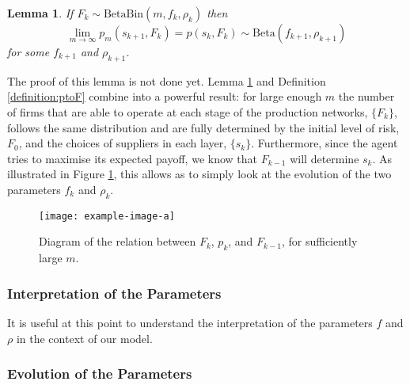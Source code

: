 \documentclass[american, abstract=on]{scrartcl}
\newcommand{\inputTikZ}[2]{%
        \scalebox{#1}{}  
      }
\theoremstyle{plain}
\newtheorem{lemma}{Lemma}
\newcommand{\Beta}{\text{Beta}}
\newcommand{\Bin}{\text{Bin}}
\begin{document}
\begin{lemma} \label{lemma:Ftop}
  If $F_k \sim \Beta\Bin(m, f_k, \rho_k)$ then \begin{equation*}\lim_{m \rightarrow \infty} p_m(s_{k + 1}, F_k) = p(s_k, F_k) \sim \Beta(f_{k + 1}, \rho_{k + 1})\end{equation*} for some $f_{k + 1}$ and $\rho_{k + 1}$.
\end{lemma}

The proof of this lemma {\color{red} is not done yet.} Lemma \ref*{lemma:Ftop} and Definition \ref*{definition:ptoF} combine into a powerful result: for large enough $m$ the number of firms that are able to operate at each stage of the production networks, $\{F_k\}$, follows the same distribution and are fully determined by the initial level of risk, $F_0$, and the choices of suppliers in each layer, $\{s_k\}$. Furthermore, since the agent tries to maximise its expected payoff, we know that $F_{k - 1}$ will determine $s_k$. As illustrated in Figure \ref*{fig:propagation-of-risk}, this allows as to simply look at the evolution of the two parameters $f_k$ and $\rho_k$.


\begin{figure}[H]
  \centering
  \texttt{[image: example-image-a]}
  \caption{Diagram of the relation between $F_k$, $p_k$, and $F_{k - 1}$, for sufficiently large $m$.}
  \label{fig:propagation-of-risk}
\end{figure}

\subsubsection{Interpretation of the Parameters}

It is useful at this point to understand the interpretation of the parameters $f$ and $\rho$ in the context of our model.

\subsubsection{Evolution of the Parameters}

\newpage
\nocite{*}
\printbibliography
\end{document}
